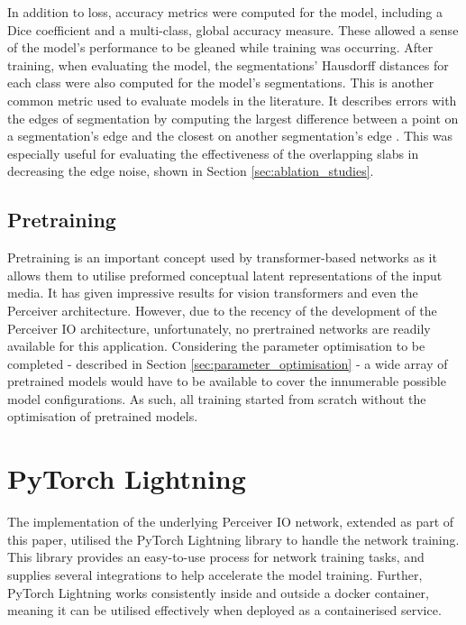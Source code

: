 \documentclass{l4proj}
\begin{document}
In addition to loss, accuracy metrics were computed for the model, including a Dice coefficient and a multi-class, global accuracy measure. These allowed a sense of the model’s performance to be gleaned while training was occurring. After training, when evaluating the model, the segmentations’ Hausdorff distances for each class were also computed for the model’s segmentations. This is another common metric used to evaluate models in the literature. It describes errors with the edges of segmentation by computing the largest difference between a point on a segmentation’s edge and the closest on another segmentation’s edge \citep{cao2023swin}. This was especially useful for evaluating the effectiveness of the overlapping slabs in decreasing the edge noise, shown in Section \ref{sec:ablation_studies}.

\subsection{Pretraining}

Pretraining is an important concept used by transformer-based networks as it allows them to utilise preformed conceptual latent representations of the input media. It has given impressive results for vision transformers and even the Perceiver architecture. However, due to the recency of the development of the Perceiver IO architecture, unfortunately, no prertrained networks are readily available for this application. Considering the parameter optimisation to be completed - described in Section \ref{sec:parameter_optimisation} - a wide array of pretrained models would have to be available to cover the innumerable possible model configurations. As such, all training started from scratch without the optimisation of pretrained models.

\section{PyTorch Lightning}

The implementation of the underlying Perceiver IO network, extended as part of this paper, utilised the PyTorch Lightning library \citep{Falcon_PyTorch_Lightning_2019} to handle the network training. This library provides an easy-to-use process for network training tasks, and supplies several integrations to help accelerate the model training. Further, PyTorch Lightning works consistently inside and outside a docker container, meaning it can be utilised effectively when deployed as a containerised service.
\end{document}
